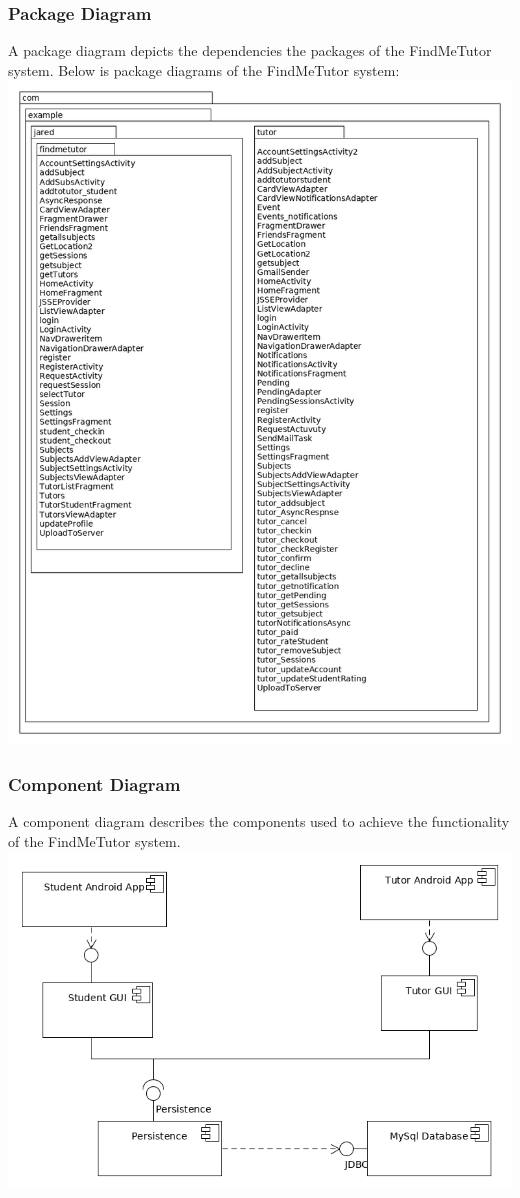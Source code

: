 \documentclass[12pt]{article}
\begin{document}
\subsubsection{Package Diagram}

A package diagram depicts the dependencies the packages of the FindMeTutor system.
Below is package diagrams of the FindMeTutor system:\\
\includegraphics[width=140mm]{./package_diagram/package_diagram.png}


\subsubsection{Component Diagram}
A component diagram describes the components used to achieve the functionality of the FindMeTutor system.\\
\includegraphics[width=140mm]{./component_diagram/component_diagram.png}
\end{document}

